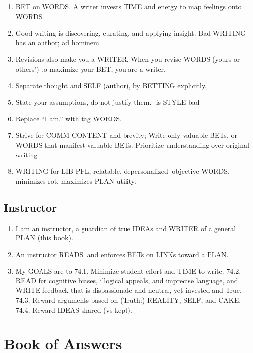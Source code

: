 \documentclass[
]{book}
\providecommand{\tightlist}{%
  \setlength{\itemsep}{0pt}\setlength{\parskip}{0pt}}
\begin{document}
\begin{enumerate}
\def\labelenumi{\arabic{enumi}.}
\setcounter{enumi}{63}
\tightlist
\item
  BET on WORDS. A writer invests TIME and energy to map feelings onto WORDS.
\item
  Good writing is discovering, curating, and applying insight.
  Bad WRITING has an author; ad hominem
\item
  Revisions also make you a WRITER. When you revise WORDS (yours or others')
  to maximize your BET, you are a writer.
\item
  Separate thought and SELF (author), by BETTING explicitly.
\item
  State your assumptions, do not justify them. -is-STYLE-bad
\item
  Replace ``I am.'' with tag WORDS.
\item
  Strive for COMM-CONTENT and brevity; Write only valuable BETs, or WORDS
  that manifest valuable BETs. Prioritize understanding over original writing.
\item
  WRITING for LIB-PPL, relatable, depersonalized, objective WORDS, minimizes rot, maximizes PLAN utility.
\end{enumerate}

\hypertarget{instructor}{%
\subsection{Instructor}\label{instructor}}

\begin{enumerate}
\def\labelenumi{\arabic{enumi}.}
\setcounter{enumi}{71}
\tightlist
\item
  I am an instructor, a guardian of true IDEAs and WRITER of a general PLAN (this book).
\item
  An instructor READS, and enforces BETs on LINKs toward a PLAN.
\item
  My GOALS are to
  74.1. Minimize student effort and TIME to write.
  74.2. READ for cognitive biases, illogical appeals, and imprecise language, and
  WRITE feedback that is dispassionate and neutral, yet invested and True.
  74.3. Reward arguments based on (Truth:) REALITY, SELF, and CAKE.
  74.4. Reward IDEAS shared (vs kept).
\end{enumerate}

\hypertarget{book-of-answers}{%
\section{Book of Answers}\label{book-of-answers}}
\end{document}
